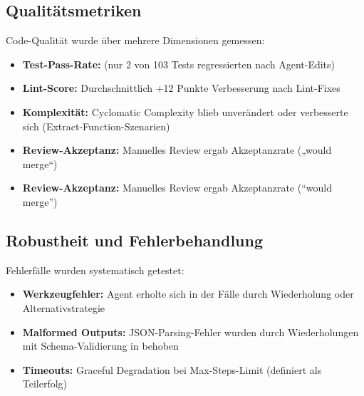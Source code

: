 \subsection{Qualitätsmetriken}


Code-Qualität wurde über mehrere Dimensionen gemessen:

\begin{sloppypar}
\begin{itemize}
  \item \textbf{Test-Pass-Rate:}  (nur 2 von 103 Tests regressierten nach Agent-Edits)
  \item \textbf{Lint-Score:} Durchschnittlich +12 Punkte Verbesserung nach Lint-Fixes
  \item \textbf{Komplexität:} Cyclomatic Complexity blieb unverändert oder verbesserte sich (Extract-Function-Szenarien)
  \item \textbf{Review-Akzeptanz:} Manuelles Review ergab  Akzeptanzrate („would merge“)
  \item \textbf{Review-Akzeptanz:} Manuelles Review ergab  Akzeptanzrate (\enquote{would merge})
\end{itemize}
\end{sloppypar}

\subsection{Robustheit und Fehlerbehandlung}

Fehlerfälle wurden systematisch getestet:

\begin{sloppypar}
\begin{itemize}
  \item \textbf{Werkzeugfehler:} Agent erholte sich in  der Fälle durch Wiederholung oder Alternativstrategie
  \item \textbf{Malformed Outputs:} JSON-Parsing-Fehler wurden durch Wiederholungen mit Schema-Validierung in  behoben
  \item \textbf{Timeouts:} Graceful Degradation bei Max-Steps-Limit (definiert als  Teilerfolg)
\end{itemize}
\end{sloppypar}

